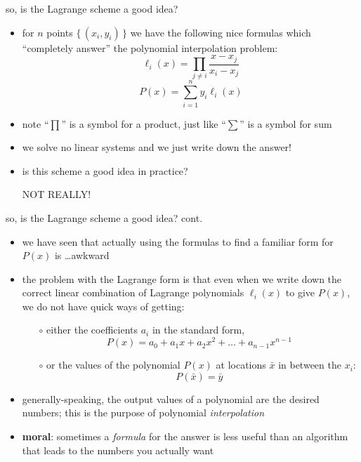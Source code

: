 \documentclass[10pt,hyperref]{beamer}
\begin{document}
\begin{frame}{so, is the Lagrange scheme a good idea?}

\begin{itemize}
\item for $n$ points $\{\,(x_i,y_i)\,\}$ we have the following nice formulas which ``completely answer'' the polynomial interpolation problem:
	$$\ell_i(x) = \prod_{j\ne i} \frac{x-x_j}{x_i-x_j}$$
	$$P(x) = \sum_{i=1}^n y_i \ell_i(x)$$
\item note ``$\prod$'' is a symbol for a product, just like ``$\sum$'' is a symbol for sum
\item we solve no linear systems and we just write down the answer!
\item is this scheme a good idea in practice?

 \alert{NOT REALLY!}
\end{itemize}
\end{frame}


\begin{frame}{so, is the Lagrange scheme a good idea?  cont.}

\begin{itemize}
\item we have seen that actually using the formulas to find a familiar form for $P(x)$ is \dots awkward
\item the problem with the Lagrange form is that even when we write down the correct linear combination of Lagrange polynomials $\ell_i(x)$ to give $P(x)$, we do not have quick ways of getting:
  \begin{itemize}
  \item[$\circ$] either the coefficients $a_i$ in the standard form,
    	$$P(x) = a_0 + a_1 x + a_2 x^2 + \dots + a_{n-1} x^{n-1}$$
  \item[$\circ$] or the values of the polynomial $P(x)$ at locations $\bar x$ in between the $x_i$:
    $$P(\bar x) = \bar y$$
  \end{itemize}
\item generally-speaking, the output values of a polynomial are the desired numbers; this is the purpose of polynomial \emph{interpolation}
\item \textbf{moral}:  sometimes a \emph{formula} for the answer is less useful than an algorithm that leads to the numbers you actually want
\end{itemize}
\end{frame}
\end{document}
